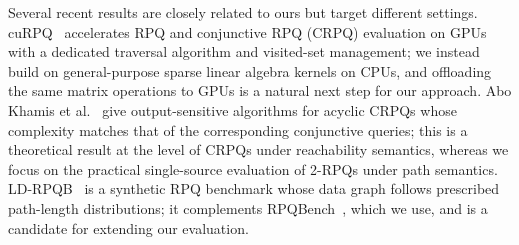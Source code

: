 Several recent results are closely related to ours but target different settings.
cuRPQ~\cite{park2026curpq} accelerates RPQ and conjunctive RPQ (CRPQ) evaluation on GPUs with a dedicated traversal algorithm and visited-set management; we instead build on general-purpose sparse linear algebra kernels on CPUs, and offloading the same matrix operations to GPUs is a natural next step for our approach.
Abo Khamis et al.~\cite{abokhamis2026acyclic} give output-sensitive algorithms for acyclic CRPQs whose complexity matches that of the corresponding conjunctive queries; this is a theoretical result at the level of CRPQs under reachability semantics, whereas we focus on the practical single-source evaluation of 2-RPQs under path semantics.
LD-RPQB~\cite{ma2025ldrpqb} is a synthetic RPQ benchmark whose data graph follows prescribed path-length distributions; it complements RPQBench~\cite{rpqbench}, which we use, and is a candidate for extending our evaluation.